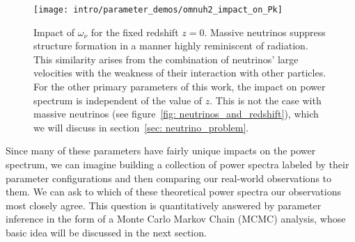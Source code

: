 \begin{figure}[htb]
  \centering
  \texttt{[image: intro/parameter\_demos/omnuh2\_impact\_on\_Pk]}
  \caption[Impact of $\omega_\nu$ on $P(k)$]{Impact of $\omega_\nu$ for the
  	fixed redshift $z=0$. Massive neutrinos suppress structure formation in
  	a manner highly reminiscent of radiation. This similarity arises from the
  	combination of neutrinos' large velocities with the weakness of their 
  	interaction with other particles.
  	For the other primary parameters of this work,
  	the impact on power spectrum is independent of the value of $z$. This is
  	not the case with massive neutrinos
  	(see figure~\ref{fig: neutrinos_and_redshift}), which we will discuss in
  	section~\ref{sec: neutrino_problem}.}
  \label{fig: omega_nu_dependence}
\end{figure}


Since many of these parameters have fairly unique impacts on the power 
spectrum, we can imagine building a collection of power spectra labeled by
their parameter configurations and then comparing our real-world observations 
to them. We can ask to which of these theoretical power spectra our 
observations most closely agree. This question is quantitatively answered by 
parameter inference in the form of a Monte Carlo Markov Chain (MCMC) analysis, whose basic idea will be discussed in the next section.

\begin{comment}

\section{Monte Carlo Markov Chains}




This can be a very brief section, but I want to discuss a little bit of how most modern parameter inference works because it motivates the need for extremely fast power spectrum computation. It provides a sort of conceptual bridge between our ``pure'' goal (quantifying the cosmos) and the nitty-gritty bulk of the paper (optimizing emulator performance).

Metropolis-Hastings algorithm.

We don't know what the true probability distribution of power spectra is. In order to build this distribution with simulation results, we simply draw from the distribution. \textcolor{orange}{Refer to ``Data to Insights'' lecture notes in order to tighten this description.}

\end{comment}

